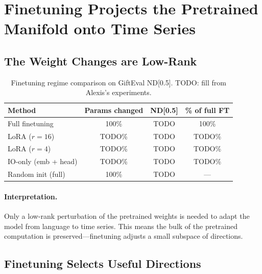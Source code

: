 \section{Finetuning Projects the Pretrained Manifold onto Time Series}
\label{sec:finetuning}


\subsection{The Weight Changes are Low-Rank}
\label{sec:lora}


\begin{table}[h]
\centering
\caption{Finetuning regime comparison on GiftEval ND[0.5]. TODO: fill from Alexis's experiments.}
\label{tab:lora}
\begin{tabular}{lccc}
\toprule
Method & Params changed & ND[0.5] & \% of full FT \\
\midrule
Full finetuning     & 100\%  & TODO & 100\%  \\
LoRA ($r=16$)       & TODO\% & TODO & TODO\% \\
LoRA ($r=4$)        & TODO\% & TODO & TODO\% \\
IO-only (emb + head)& TODO\% & TODO & TODO\% \\
Random init (full)  & 100\%  & TODO & ---    \\
\bottomrule
\end{tabular}
\end{table}

\paragraph{Interpretation.} Only a low-rank perturbation of the pretrained weights is needed to adapt the model from language to time series. This means the bulk of the pretrained computation is preserved---finetuning adjusts a small subspace of directions.


\subsection{Finetuning Selects Useful Directions}
\label{sec:dimensionality}


